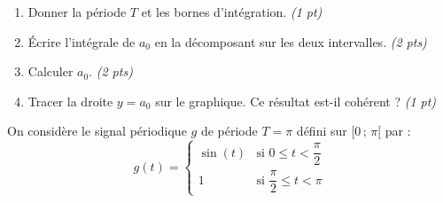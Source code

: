 \documentclass[a4paper,11pt]{article}
\begin{document}
\begin{enumerate}[label=\textbf{\arabic*.}]
  \item Donner la période $T$ et les bornes d'intégration. \hfill \textit{(1 pt)}
  \begin{tcolorbox}[reponsebox, height=1.2cm]\end{tcolorbox}

  \item Écrire l'intégrale de $a_0$ en la décomposant sur les deux intervalles. \hfill \textit{(2 pts)}
  \begin{tcolorbox}[reponsebox, height=2cm]\end{tcolorbox}

  \item Calculer $a_0$. \hfill \textit{(2 pts)}
  \begin{tcolorbox}[reponsebox, height=2.5cm]\end{tcolorbox}

  \item Tracer la droite $y = a_0$ sur le graphique. Ce résultat est-il cohérent ? \hfill \textit{(1 pt)}
  \begin{tcolorbox}[reponsebox, height=1.2cm]\end{tcolorbox}
\end{enumerate}

\vspace{0.3cm}

\begin{tcolorbox}[exobox={Exercice 2 \hfill \normalfont\textit{(7 points)}}]
  On considère le signal périodique $g$ de période $T = \pi$ défini sur $[0\,;\,\pi[$ par :
  \[
    g(t) = \begin{cases} \sin(t) & \text{si } 0 \leq t < \dfrac{\pi}{2} \\[6pt] 1 & \text{si } \dfrac{\pi}{2} \leq t < \pi \end{cases}
  \]
\end{tcolorbox}
\end{document}
